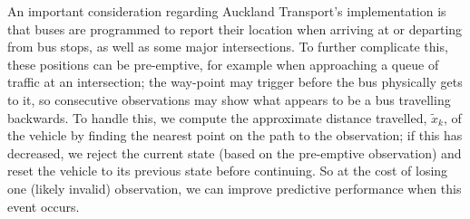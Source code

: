 An important consideration regarding Auckland Transport's \rt implementation is that
buses are programmed to report their location when arriving at or departing from
bus stops, as well as some major intersections.
To further complicate this,
these positions can be pre-emptive,
for example when approaching a queue of traffic at an intersection;
the way-point may trigger before the bus physically gets to it,
so consecutive observations may show what appears to be a bus travelling backwards.
To handle this, we compute the approximate distance travelled, $\tilde x_k$,
of the vehicle by finding the nearest point on the path to the observation;
if this has decreased, we reject the current state (based on the pre-emptive observation)
and reset the vehicle 
to its previous state before continuing.
So at the cost of losing one (likely invalid) observation,
we can improve predictive performance
when this event occurs.

